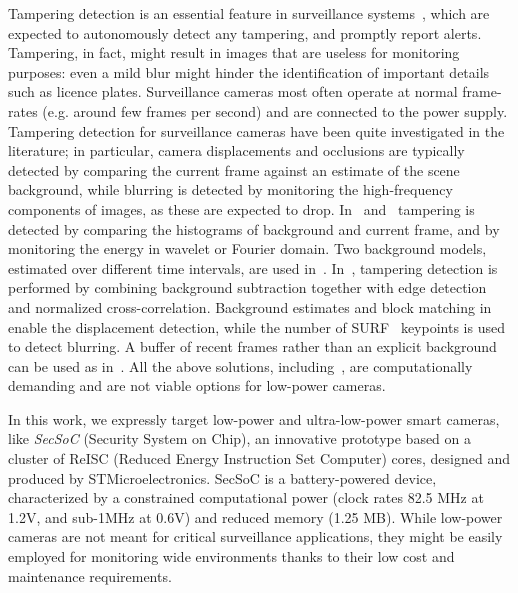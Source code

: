 \documentclass{llncs}
\begin{document}
Tampering detection is an essential feature in surveillance systems~\cite{hampapur2005smart}, which are expected to autonomously detect any tampering, and promptly report alerts. Tampering, in fact, might result in images that are useless for monitoring purposes: even a mild blur might hinder the identification of important details such as licence plates. Surveillance cameras most often operate at normal frame-rates (e.g. around few frames per second) and are connected to the power supply. Tampering detection for surveillance cameras have been quite investigated in the literature; in particular, camera displacements and occlusions are typically detected by comparing the current frame against an estimate of the scene background, while blurring is detected by monitoring the high-frequency components of images, as these are expected to drop. In~\cite{aksay2007camera} and~\cite{saglam2009real} tampering is detected by comparing the histograms of background and current frame, and by monitoring the energy in wavelet or Fourier domain. Two background models, estimated over different time intervals, are used in~\cite{saglam2009real}. In~\cite{gil2007automatic}, tampering detection is performed by combining background subtraction together with edge detection and normalized cross-correlation. Background estimates and block matching in~\cite{tsesmelis2013tamper} enable the displacement detection, while the number of SURF~\cite{bay2006surf} keypoints is used to detect blurring. A buffer of recent frames rather than an explicit background can be used as in~\cite{ribnick2006real}. All the above solutions, including~\cite{harasse2004automated,kryjak2012fpga}, are computationally demanding and are not viable options for low-power cameras.

In this work, we expressly target low-power and ultra-low-power smart cameras, like \emph{SecSoC} (Security System on Chip), an innovative prototype based on a cluster of ReISC (Reduced Energy Instruction Set Computer) cores, designed and produced by STMicroelectronics. SecSoC is a battery-powered device, characterized by a constrained computational power (clock rates 82.5 MHz at 1.2V, and sub-1MHz at 0.6V) and reduced memory (1.25 MB). While low-power cameras are not meant for critical surveillance applications, they might be easily employed for monitoring wide environments thanks to their low cost and maintenance requirements.  %
\end{document}
